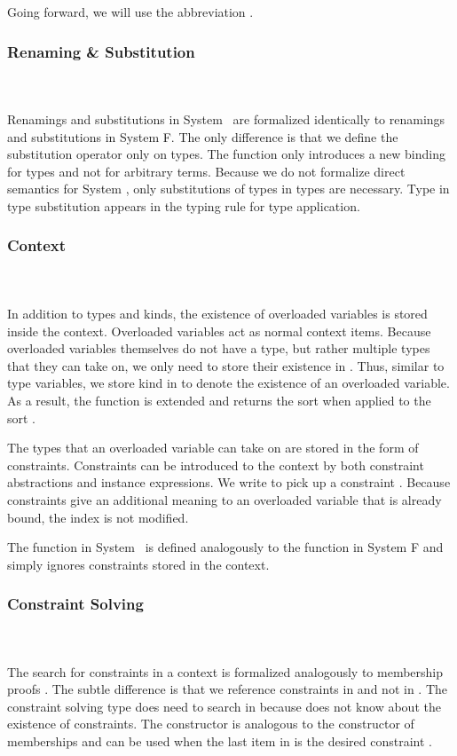 \noindent Going forward, we will use the abbreviation \FoCstr.

\subsubsection{Renaming \& Substitution}\hfill\\\\
Renamings and substitutions in System \Fo\ are formalized identically to renamings and substitutions in System F. 
The only difference is that we define the substitution operator only on types. 
\Fosubs
The  function only introduces a new binding for types and not for arbitrary terms.
Because we do not formalize direct semantics for System \Fo, only substitutions of types in types are necessary. Type in type substitution appears in the typing rule for type application.

\subsubsection{Context}\hfill\\\\
In addition to types and kinds, the existence of overloaded variables is stored inside the context. Overloaded variables act as normal context items. 
Because overloaded variables themselves do not have a type, but rather multiple types that they can take on, we only need to store their existence in . Thus, similar to type variables, we store kind  in  to denote the existence of an overloaded variable. As a result, the  function is extended and returns the sort  when applied to the sort .

\noindent The types that an overloaded variable can take on are stored in the form of constraints. Constraints can be introduced to the context by both constraint abstractions and instance expressions.
\FoCtx
We write    to pick up a constraint . 
Because constraints give an additional meaning to an overloaded variable that is already bound, the index  is not modified. 

\noindent The  function in System \Fo\ is defined analogously to the  function in System F and simply ignores constraints stored in the context.

\subsubsection{Constraint Solving}\hfill\\\\
The search for constraints in a context is formalized analogously to membership proofs   . The subtle difference is that we reference constraints in  and not in . The constraint solving type does need to search in  because  does not know about the existence of constraints.
\FoCstrSolve
The  constructor is analogous to the  constructor of memberships and can be used when the last item in  is the desired constraint .

